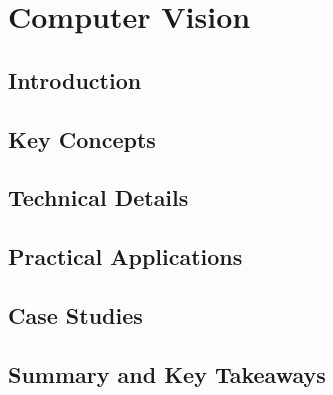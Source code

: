 ﻿%

\chapter{Computer Vision}
\label{ch:chapter-05}

\section{Introduction}


\section{Key Concepts}


\section{Technical Details}


\section{Practical Applications}


\section{Case Studies}


\section{Summary and Key Takeaways}


